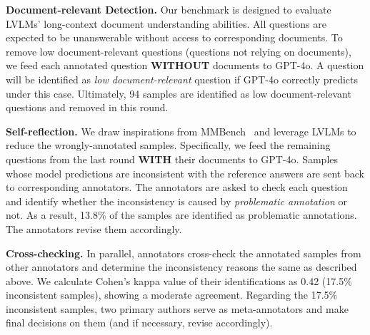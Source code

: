 \noindent \textbf{Document-relevant Detection.} Our benchmark is designed to evaluate LVLMs' long-context document understanding abilities. All questions are expected to be unanswerable without access to corresponding documents. To remove low document-relevant questions (\ie questions not relying on documents), we feed each annotated question \textbf{WITHOUT} documents to GPT-4o. A question will be identified as \textit{low document-relevant} question if GPT-4o correctly predicts under this case. Ultimately, 94 samples are identified as low document-relevant questions and removed in this round.

\noindent \textbf{Self-reflection.} We draw inspirations from MMBench~\cite{mmbench2023} and leverage LVLMs to reduce the wrongly-annotated samples. Specifically, we feed the remaining questions from the last round \textbf{WITH} their documents to GPT-4o. Samples whose model predictions are inconsistent with the reference answers are sent back to corresponding annotators. The annotators are asked to check each question and identify whether the inconsistency is caused by \textit{problematic annotation} or not. As a result, 13.8\% of the samples are identified as problematic annotations. The annotators revise them accordingly.

\noindent \textbf{Cross-checking.}
In parallel, annotators cross-check the annotated samples from other annotators and determine the inconsistency reasons the same as described above. We calculate Cohen’s kappa value of their identifications as 0.42 (17.5\% inconsistent samples), showing a moderate agreement. Regarding the 17.5\% inconsistent samples, two primary authors serve as meta-annotators and make final decisions on them (and if necessary, revise accordingly).

